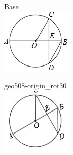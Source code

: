 \documentclass[12pt]{article}
\begin{document}
\begin{center}
\begin{minipage}{0.32\textwidth}\centering
Base\\
\includegraphics[width=0.95\linewidth]{out_rommath_origin/items/geo508-origin/assets/figure.png}
\end{minipage}
\hfill\begin{minipage}{0.32\textwidth}\centering
geo508-origin\_rot30\\
\includegraphics[width=0.95\linewidth]{out_rommath_origin/items/geo508-origin/assets/figure_rot30.png}

\end{minipage}
\end{center}
\end{document}
